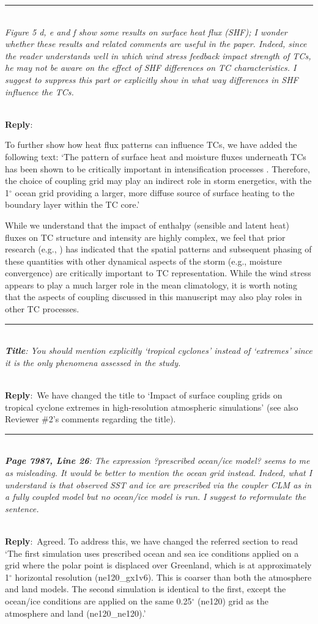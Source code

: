 \documentclass{article}
\newcommand{\genDisc}[1]{\medskip \hrule \noindent \\
               {\itshape #1}}
\newcommand{\pointRaised}[2]{\medskip \hrule \noindent \\
               {\itshape {\bfseries #1}: #2}}
\newcommand{\reply}{\noindent \\ \textbf{Reply}:\ }
\newcommand{\degree}{$^{\circ}$}
\begin{document}
\genDisc{Figure 5 d, e and f show some results on surface heat flux (SHF); I wonder whether these results and related comments are useful in the paper. Indeed, since the reader understands well in which wind stress feedback impact strength of TCs, he may not be aware on the effect of SHF differences on TC characteristics. I suggest to suppress this part or explicitly show in what way differences in SHF influence the TCs.}

\reply{To further show how heat flux patterns can influence TCs, we have added the following text: `The pattern of surface heat and moisture fluxes underneath TCs has been shown to be critically important in intensification processes \citep{Peng1999,Chan2001,Wang2004}. Therefore, the choice of coupling grid may play an indirect role in storm energetics, with the 1\degree{} ocean grid providing a larger, more diffuse source of surface heating to the boundary layer within the TC core.'

While we understand that the impact of enthalpy (sensible and latent heat) fluxes on TC structure and intensity are highly complex, we feel that prior research (e.g., \citet{Peng1999,Chan2001,Wang2004}) has indicated that the spatial patterns and subsequent phasing of these quantities with other dynamical aspects of the storm (e.g., moisture convergence) are critically important to TC representation. While the wind stress appears to play a much larger role in the mean climatology, it is worth noting that the aspects of coupling discussed in this manuscript may also play roles in other TC processes.}

\pointRaised{Title}{You should mention explicitly `tropical cyclones' instead of `extremes' since it is the only phenomena assessed in the study.}

\reply{We have changed the title to `Impact of surface coupling grids on tropical cyclone extremes in high-resolution atmospheric simulations' (see also Reviewer \#2's comments regarding the title).}

\pointRaised{Page 7987, Line 26}{The expression ?prescribed ocean/ice model? seems to me as misleading. It would be better to mention the ocean grid instead. Indeed, what I understand is that observed SST and ice are prescribed via the coupler CLM as in a fully coupled model but no ocean/ice model is run. I suggest to reformulate the sentence.}

\reply{Agreed. To address this, we have changed the referred section to read `The first simulation uses prescribed ocean and sea ice conditions applied on a grid where the polar point is displaced over Greenland, which is at approximately 1\degree{} horizontal resolution (ne120\_gx1v6). This is coarser than both the atmosphere and land models. The second simulation is identical to the first, except the ocean/ice conditions are applied on the same 0.25\degree{} (ne120) grid as the atmosphere and land (ne120\_ne120).'}
\end{document}
